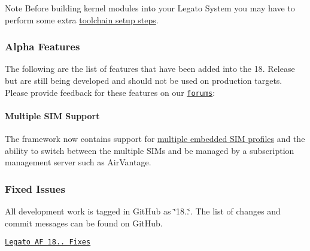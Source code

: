 \begin{DoxyNote}{Note}
Before building kernel modules into your Legato System you may have to perform some extra \hyperlink{basicBuildToolchain_basicBuildLegato_ToolchainSWI_KO}{toolchain setup steps}.
\end{DoxyNote}
\hypertarget{releaseNotes18051_rn1805_AFeatures}{}\subsubsection{Alpha Features}\label{releaseNotes18051_rn1805_AFeatures}
The following are the list of features that have been added into the 18. Release but are still being developed and should not be used on production targets. Please provide feedback for these features on our \href{https://forum.legato.io/}{\tt forums}\+:\hypertarget{releaseNotes18051_rn1805_Features_SIM}{}\paragraph{Multiple S\+I\+M Support}\label{releaseNotes18051_rn1805_Features_SIM}
The framework now contains support for \hyperlink{c_sim_le_sim_profile_switch}{multiple embedded S\+IM profiles} and the ability to switch between the multiple S\+I\+Ms and be managed by a subscription management server such as Air\+Vantage.\hypertarget{releaseNotes18051_rn1805_Fixes}{}\subsubsection{Fixed Issues}\label{releaseNotes18051_rn1805_Fixes}
All development work is tagged in Git\+Hub as \char`\"{}18..\char`\"{}. The list of changes and commit messages can be found on Git\+Hub.


\begin{DoxyItemize}
\item \href{https://github.com/legatoproject/legato-af/commits/18.05.0}{\tt Legato AF 18.. Fixes}
\end{DoxyItemize}

